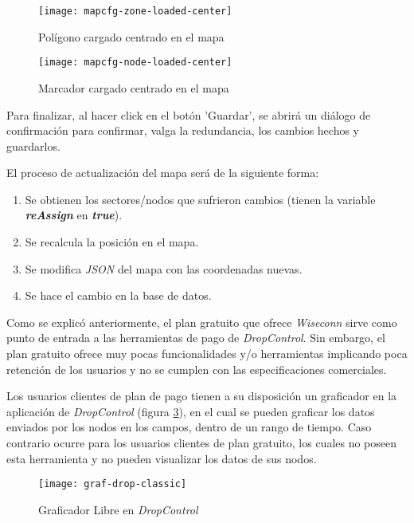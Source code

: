 \begin{figure}[H]
	\centering
	\texttt{[image: mapcfg-zone-loaded-center]}
	\caption{\label{fig:mapcfg-zone-loaded-center} Polígono cargado centrado en el mapa}
\end{figure}

\begin{figure}[H]
	\centering
	\texttt{[image: mapcfg-node-loaded-center]}
	\caption{\label{fig:mapcfg-node-loaded-center} Marcador cargado centrado en el mapa}
\end{figure}

Para finalizar, al hacer click en el botón 'Guardar', se abrirá un diálogo de confirmación para confirmar, valga la redundancia, los cambios hechos y guardarlos.

El proceso de actualización del mapa será de la siguiente forma:
\begin{enumerate}
    \item Se obtienen los sectores/nodos que sufrieron cambios (tienen la variable \textbf{\textit{reAssign}} en \textbf{\textit{true}}).
    \item Se recalcula la posición en el mapa.
    \item Se modifica \textit{JSON} del mapa con las coordenadas nuevas.
    \item Se hace el cambio en la base de datos.
\end{enumerate}

\iffalse
{}

Como se explicó anteriormente, el plan gratuito que ofrece \textit{Wiseconn} sirve como punto de entrada a las herramientas
de pago de \textit{DropControl}. Sin embargo, el plan gratuito ofrece muy pocas funcionalidades y/o herramientas
implicando poca retención de los usuarios y no se cumplen con las especificaciones comerciales.

Los usuarios clientes de plan de pago tienen a su disposición un graficador en la aplicación de \textit{DropControl} (figura \ref{fig:graf-drop-classic}), en el cual
se pueden graficar los datos enviados por los nodos en los campos, dentro de un rango de tiempo.
Caso contrario ocurre para los usuarios clientes de plan gratuito, los cuales no poseen esta herramienta y
no pueden visualizar los datos de sus nodos.

\begin{figure}[H]
	\centering
	\texttt{[image: graf-drop-classic]}
	\caption{\label{fig:graf-drop-classic} Graficador Libre en \textit{DropControl}}
\end{figure}

